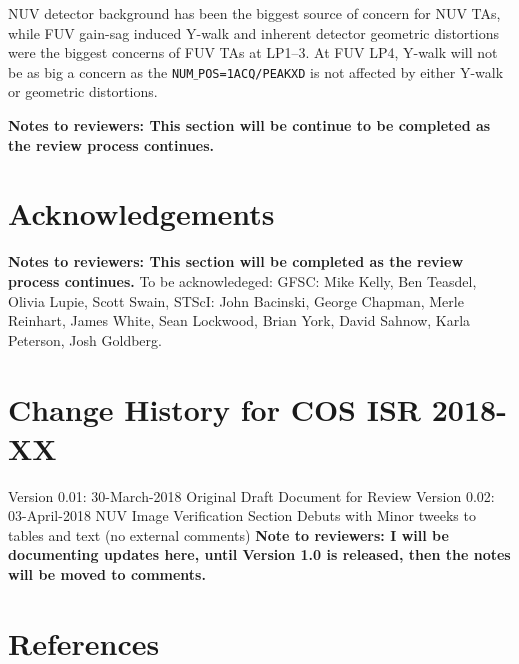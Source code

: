 \documentclass{stsci_report}
\newcommand{\numposone}{\texttt{NUM$\_$POS=1}}
\newcommand{\tacq}[1]{\texttt{ACQ/#1}}
\begin{document}
NUV detector background has been the biggest source of concern
for NUV TAs, while FUV gain-sag induced Y-walk and inherent detector geometric distortions
were the biggest concerns of FUV TAs at LP1--3. At FUV LP4, Y-walk will not be as big a concern as
the \numposone \tacq{PEAKXD} is not affected by either Y-walk or geometric distortions.

{\bf Notes to reviewers: This section will be continue to be completed as the review process continues.}

\clearpage
\vspace{-0.3cm}
\section{Acknowledgements}
{\bf Notes to reviewers: This section will be completed as the review process continues.}
To be acknowledeged:
GFSC: Mike Kelly, Ben Teasdel, Olivia Lupie, Scott Swain,
STScI: John Bacinski, George Chapman, Merle Reinhart, James White, Sean Lockwood, Brian York, David Sahnow, Karla Peterson, Josh Goldberg.

\vspace{-0.3cm}
\vspace{0.3cm}
\section{Change History for COS ISR 2018-XX}\label{sec:History}
\vspace{0.3cm}
Version 0.01: 30-March-2018 Original Draft Document for Review
Version 0.02: 03-April-2018 NUV Image Verification Section Debuts with  Minor tweeks to tables and text (no external comments)
{\bf Note to reviewers: I will be documenting updates here, until Version 1.0 is released, then the notes
will be moved to comments.}
\vspace{0.3cm}
\section{References}\label{sec:References}
\vspace{0.3cm}
\end{document}
